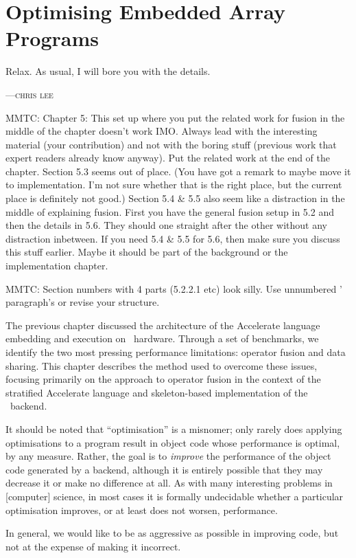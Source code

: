 
\chapter{Optimising Embedded Array Programs}
\label{ch:optimising}
\epigraph{Relax. As usual, I will bore you with the details.}%
{\textsc{---chris lee}}

MMTC: Chapter 5: This set up where you put the related work for fusion in the middle of the chapter doesn't work IMO. Always lead with the interesting material (your contribution) and not with the boring stuff (previous work that expert readers already know anyway). Put the related work at the end of the chapter.
Section 5.3 seems out of place. (You have got a remark to maybe move it to implementation. I'm not sure whether that is the right place, but the current place is definitely not good.)
Section 5.4 \& 5.5 also seem like a distraction in the middle of explaining fusion. First you have the general fusion setup in 5.2 and then the details in 5.6. They should one straight after the other without any distraction inbetween. If you need 5.4 \& 5.5 for 5.6, then make sure you discuss this stuff earlier. Maybe it should be part of the background or the implementation chapter.

MMTC: Section numbers with 4 parts (5.2.2.1 etc) look silly. Use unnumbered '\\paragraph's or revise your structure.

The previous chapter discussed the architecture of the Accelerate language
embedding and execution on \CUDA\ hardware. Through a set of benchmarks, we
identify the two most pressing performance limitations: operator fusion and data
sharing. This chapter describes the method used to overcome these issues,
focusing primarily on the approach to operator fusion in the context of the
stratified Accelerate language and skeleton-based implementation of the \CUDA\
backend.

It should be noted that ``optimisation'' is a misnomer; only rarely does
applying optimisations to a program result in object code whose performance is
optimal, by any measure. Rather, the goal is to \emph{improve} the performance
of the object code generated by a backend, although it is entirely possible that
they may decrease it or make no difference at all. As with many interesting
problems in [computer] science, in most cases it is formally undecidable whether
a particular optimisation improves, or at least does not worsen, performance.

In general, we would like to be as aggressive as possible in improving code, but
not at the expense of making it incorrect.


